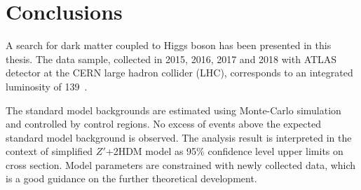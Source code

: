 \chapter{Conclusions}

\label{ch:con}

\par A search for dark matter coupled to Higgs boson has been presented in this thesis. 
The data sample, collected in 2015, 2016, 2017 and 2018 with ATLAS detector at the CERN large hadron collider (LHC), corresponds to an integrated luminosity of 139~\ifb. 

\par The standard model backgrounds are estimated using Monte-Carlo simulation and controlled by control regions. 
No excess of events above the expected standard model background is observed. 
The analysis result is interpreted in the context of simplified $Z\prime$+2HDM model as 95\% confidence level upper limits on cross section. 
Model parameters are constrained with newly collected data, which is a good guidance on the further theoretical development.
